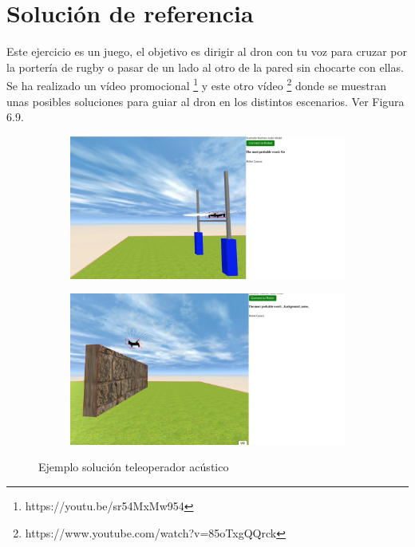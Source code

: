 \section{Solución de referencia}

Este ejercicio es un juego, el objetivo es dirigir al dron con tu voz para cruzar por la portería de rugby o pasar de un lado al otro de la pared sin chocarte con ellas. Se ha realizado un vídeo promocional \footnote{https://youtu.be/sr54MxMw954} y este otro vídeo \footnote{https://www.youtube.com/watch?v=85oTxgQQrck} donde se muestran unas posibles soluciones para guiar al dron en los distintos escenarios. Ver Figura 6.9.

 \begin{figure}[H]
  \begin{subfigure}[b]{0.5\textwidth}
  \centering
    \includegraphics[width=1\textwidth, height=0.7\textwidth]{chapters/images/solucionaudio.png}
    \caption{}
    \label{fig:f1}
  \end{subfigure}
  \hfill
  \begin{subfigure}[b]{0.5\textwidth}
  \centering
    \includegraphics[width=1\textwidth, height=0.7\textwidth]{chapters/images/solucionaudio2.png}
	\caption{}    
    \label{fig:f2}
 
  \end{subfigure}
  \caption{Ejemplo solución teleoperador acústico}
\end{figure}


